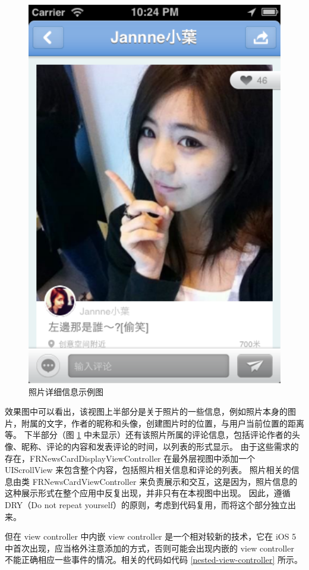 \begin{figure}[h!]
    \centering
    \includegraphics[width=320pt]{figure/card_detail.png}
    \caption{照片详细信息示例图}
    \label{card-detail}
\end{figure}

效果图中可以看出，该视图上半部分是关于照片的一些信息，例如照片本身的图片，附属的文字，作者的昵称和头像，创建图片时的位置，与用户当前位置的距离等。
下半部分（图 \ref{card-detail} 中未显示）还有该照片所属的评论信息，包括评论作者的头像、昵称、评论的内容和发表评论的时间，以列表的形式显示。
由于这些需求的存在，FRNewsCardDisplayViewController 在最外层视图中添加一个 UIScrollView 来包含整个内容，包括照片相关信息和评论的列表。
照片相关的信息由类 FRNewsCardViewController 来负责展示和交互，这是因为，照片信息的这种展示形式在整个应用中反复出现，并非只有在本视图中出现。
因此，遵循 DRY（Do not repeat yourself）的原则，考虑到代码复用，而将这个部分独立出来。

但在 view controller 中内嵌 view controller 是一个相对较新的技术，它在 iOS 5 中首次出现，应当格外注意添加的方式，否则可能会出现内嵌的 view controller 不能正确相应一些事件的情况。相关的代码如代码 \ref{nested-view-controller} 所示。

